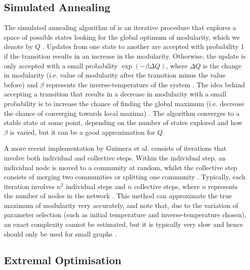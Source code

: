 
\subsection{Simulated Annealing}
\label{subsec:simulatedAnnealing}

The simulated annealing algorithm of \cite{KGV83} is an iterative procedure that explores a space of possible states looking for the global optimum of modularity, which we denote by $Q$ \cite{KGV83,For10}.
Updates from one state to another are accepted with probability 1 if the transition results in an increase in the modularity.
Otherwise, the update is only accepted with a small probability $\exp(-\beta \Delta Q)$, where $\Delta Q$ is the change in modularity (i.e. value of modularity after the transition minus the value before) and $\beta$ represents the inverse-temperature of the system \cite{KGV83,For10}.
The idea behind accepting a transition that results in a decrease in modularity with a small probability is to increase the chance of finding the global maximum (i.e. decrease the chance of converging towards local maxima) \cite{For10}.
The algorithm converges to a stable state at some point, depending on the number of states explored and how $\beta$ is varied, but it can be a good approximation for $Q$.

A more recent implementation by Guimera et al. \cite{GSA04} consists of iterations that involve both individual and collective steps.
Within the individual step, an individual node is moved to a community at random, whilst the collective step consists of merging two communities or splitting one community \cite{GSA04}.
Typically, each iteration involves $n^{2}$ individual steps and $n$ collective steps, where $n$ represents the number of nodes in the network \cite{For10}.
This method can approximate the true maximum of modularity very accurately, and note that, due to the variation of parameter selection (such as initial temperature and inverse-temperature chosen), an exact complexity cannot be estimated, but it is typically very slow and hence should only be used for small graphs \cite{For10}.


\subsection{Extremal Optimisation}
\label{subsec:extremalOptimisation}

